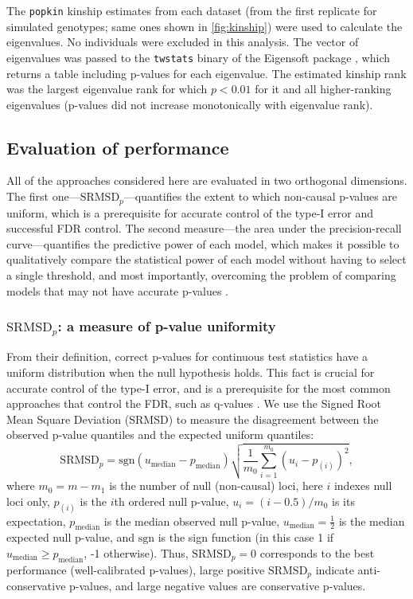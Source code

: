 \documentclass[11pt]{article}
\newcommand{\rmsd}{\text{SRMSD}_p}
\begin{document}
The \texttt{popkin} kinship estimates from each dataset (from the first replicate for simulated genotypes; same ones shown in \cref{fig:kinship}) were used to calculate the eigenvalues.
No individuals were excluded in this analysis.
The vector of eigenvalues was passed to the \texttt{twstats} binary of the Eigensoft package \citep{patterson_population_2006}, which returns a table including p-values for each eigenvalue.
The estimated kinship rank was the largest eigenvalue rank for which $p < 0.01$ for it and all higher-ranking eigenvalues (p-values did not increase monotonically with eigenvalue rank).


\subsection{Evaluation of performance}

All of the approaches considered here are evaluated in two orthogonal dimensions.
The first one---$\rmsd$---quantifies the extent to which non-causal p-values are uniform, which is a prerequisite for accurate control of the type-I error and successful FDR control.
The second measure---the area under the precision-recall curve---quantifies the predictive power of each model, which makes it possible to qualitatively compare the statistical power of each model without having to select a single threshold, and most importantly, overcoming the problem of comparing models that may not have accurate p-values \citep{bouaziz_accounting_2011}.

\subsubsection{$\rmsd$: a measure of p-value uniformity}

From their definition, correct p-values for continuous test statistics have a uniform distribution when the null hypothesis holds.
This fact is crucial for accurate control of the type-I error, and is a prerequisite for the most common approaches that control the FDR, such as q-values \citep{storey_positive_2003, storey_statistical_2003}.
We use the Signed Root Mean Square Deviation (SRMSD) to measure the disagreement between the observed p-value quantiles and the expected uniform quantiles:
$$
\rmsd
=
\text{sgn}(u_\text{median} - p_\text{median} ) \sqrt{ \frac{1}{m_0} \sum_{i = 1}^{m_0} \left( u_i - p_{(i)} \right)^2 },
$$
where
$m_0 = m - m_1$ is the number of null (non-causal) loci,
here $i$ indexes null loci only,
$p_{(i)}$ is the $i$th ordered null p-value,
$u_i = ( i - 0.5 ) / m_0$ is its expectation,
$p_\text{median}$ is the median observed null p-value,
$u_\text{median} = \frac{1}{2}$ is the median expected null p-value,
and $\text{sgn}$ is the sign function (in this case 1 if $u_\text{median} \ge p_\text{median}$, -1 otherwise).
Thus, $\rmsd = 0$ corresponds to the best performance (well-calibrated p-values), large positive $\rmsd$ indicate anti-conservative p-values, and large negative values are conservative p-values.
\end{document}
